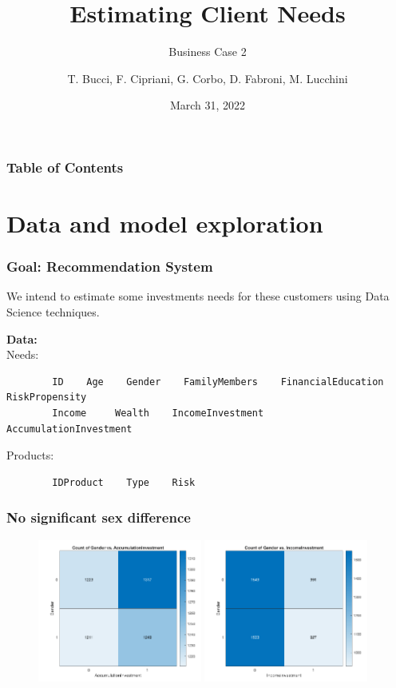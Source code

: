\documentclass{beamer}
\title{Estimating Client Needs}
\subtitle{Business Case 2}
\author{T. Bucci, F. Cipriani, G. Corbo, D. Fabroni, M. Lucchini}
\institute{Politecnico di Milano}
\date{March 31, 2022}
\begin{document}
\frame{\titlepage}

\begin{frame}
    \frametitle{Table of Contents}
    \tableofcontents
\end{frame}

\section{Data and model exploration}
\begin{frame}[fragile]
    \frametitle{Goal: Recommendation System}
    We intend to estimate some investments needs for these customers using Data Science techniques.
    
    \vspace*{1cm}

    \textbf{Data:}\\

    Needs:\\
    {\tiny
    \begin{verbatim}
    	ID    Age    Gender    FamilyMembers    FinancialEducation    RiskPropensity
    	Income     Wealth    IncomeInvestment    AccumulationInvestment
    \end{verbatim}
    }

    Products:\\
    {\tiny
    \begin{verbatim}
    	IDProduct    Type    Risk
    \end{verbatim}
    }
\end{frame}

\begin{frame}
	\frametitle{No significant sex difference}
	\begin{figure}
	   \includegraphics[width=0.48\textwidth]{hm2}
	   \hfill
	   \includegraphics[width=0.48\textwidth]{hm3}
	\end{figure}
\end{frame}
\end{document}
